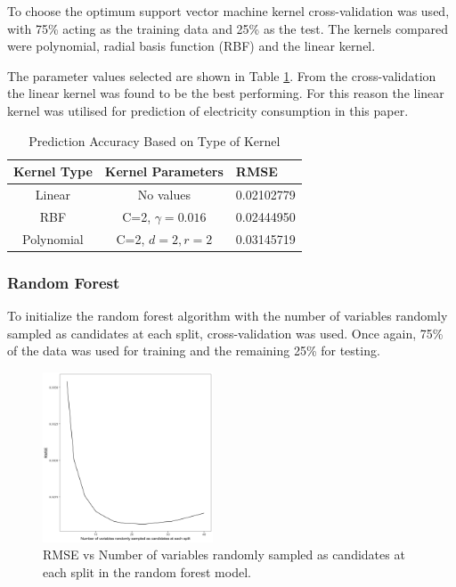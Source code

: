 To choose the optimum support vector machine kernel cross-validation was used, with 75\% acting as the training data and 25\% as the test. The kernels compared were polynomial, radial basis function (RBF) and the linear kernel.

The parameter values selected are shown in Table \ref{tab:kernel}. From the cross-validation the linear kernel was found to be the best performing. For this reason the linear kernel was utilised for prediction of electricity consumption in this paper.

\begin{table}
	\caption{Prediction Accuracy Based on Type of Kernel}
	\label{tab:kernel}
	\begin{tabular}{ccl}
		\toprule
		Kernel Type& Kernel Parameters & RMSE\\
		\midrule
		Linear & No values & 0.02102779\\
		RBF & C=2, $\gamma=0.016$ & 0.02444950\\
		Polynomial & C=2, $d=2, r=2$ & 0.03145719 \\
		\bottomrule
	\end{tabular}
\end{table}


\subsubsection{Random Forest}

To initialize the random forest algorithm with the number of variables randomly sampled as candidates at each split, cross-validation was used. Once again, 75\% of the data was used for training and the remaining 25\% for testing.

\begin{figure}
	\includegraphics[width=0.45\textwidth]{Chapter5/figures/rforest_parameter_tuning}
	\caption{RMSE vs Number of variables randomly sampled as candidates at each split in the random forest model.}
	\label{fig:rf_param_tune}
\end{figure}


